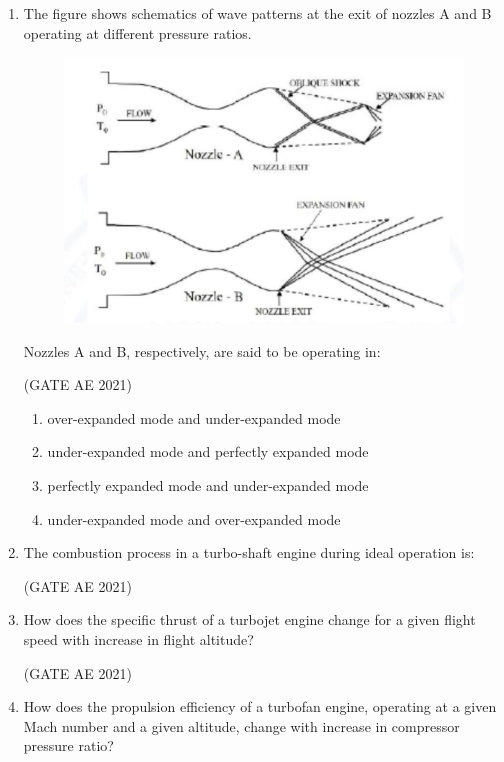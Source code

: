 \documentclass[journal,12pt,onecolumn]{IEEEtran}
\theoremstyle{remark}
\begin{document}
\begin{flushleft}
\begin{enumerate}
\item 
The figure shows schematics of wave patterns at the exit of nozzles A and B operating at different pressure ratios. 
\begin{figure}[H]
    \centering
    \includegraphics[width=0.5\columnwidth]{figs/q1 4.png}
    \caption{}
    \label{fig:placeholder}
\end{figure}
Nozzles A and B, respectively, are said to be operating in:

\hfill (GATE AE 2021)

\begin{enumerate}
\item over-expanded mode and under-expanded mode
\item under-expanded mode and perfectly expanded mode
\item perfectly expanded mode and under-expanded mode
\item under-expanded mode and over-expanded mode

\end{enumerate}
\item 
The combustion process in a turbo-shaft engine during ideal operation is:

\hfill (GATE AE 2021)

\begin{enumerate}
\end{enumerate}

\item 
How does the specific thrust of a turbojet engine change for a given flight speed with increase in flight altitude?

\hfill (GATE AE 2021)

\begin{enumerate}
\end{enumerate}
\item 
How does the propulsion efficiency of a turbofan engine, operating at a given Mach number and a given altitude, change with increase in compressor pressure ratio?


\end{enumerate}
\end{flushleft}
\end{document}
